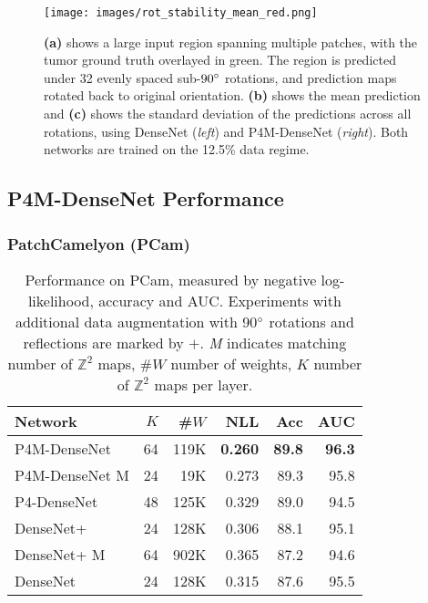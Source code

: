 \documentclass{llncs}
\begin{document}
\begin{figure}[t]
\texttt{[image: images/rot\_stability\_mean\_red.png]}
\caption{\textbf{(a)} shows a large input region spanning multiple patches, with the tumor ground truth overlayed in green. The region is predicted under 32 evenly spaced sub-$90\degree$ rotations, and prediction maps rotated back to original orientation. \textbf{(b)} shows the mean prediction and \textbf{(c)} shows the standard deviation of the predictions across all rotations, using DenseNet (\textit{left}) and P4M-DenseNet (\textit{right}). Both networks are trained on the 12.5\% data regime. }\label{fig:rotstable}
\end{figure}

\subsection{P4M-DenseNet Performance}
\vspace{-.5cm}
\subsubsection{PatchCamelyon (PCam)}

\begin{SCtable}[]

\centering

\begin{tabular}{@{}lrrrrr@{}}
\toprule
Network & $K$ & \#$W$  &  NLL & Acc& AUC\\ 
\midrule

P4M-DenseNet   & 64 & 119K  & \textbf{0.260}  & \textbf{89.8}       &   \textbf{96.3 }  \\
P4M-DenseNet M & 24 & 19K  & 0.273   & 89.3            &   95.8  \\
P4-DenseNet    & 48 & 125K  & 0.329   & 89.0             &   94.5         \\
DenseNet+      & 24 & 128K  & 0.306    & 88.1            &   95.1          \\
DenseNet+   M  & 64 & 902K  & 0.365   & 87.2             & 94.6      \\
DenseNet       & 24 & 128K  & 0.315   & 87.6             &   95.5          \\
 \bottomrule
 
\end{tabular}



\caption{Performance on PCam, measured by negative log-likelihood, accuracy and AUC. Experiments with additional data augmentation with 90$\degree$ rotations and reflections are marked by $+$. \textit{M} indicates matching number of $\mathbb{Z}^2$ maps, \#$W$ number of weights, $K$ number of $\mathbb{Z}^2$ maps per layer.}

\label{tab:patch}

\end{SCtable}
\end{document}
